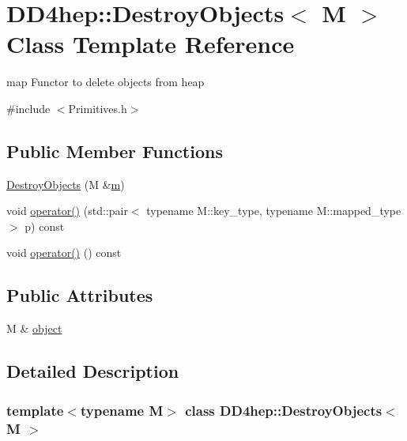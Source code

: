 \hypertarget{class_d_d4hep_1_1_destroy_objects}{}\section{D\+D4hep\+:\+:Destroy\+Objects$<$ M $>$ Class Template Reference}
\label{class_d_d4hep_1_1_destroy_objects}


map Functor to delete objects from heap  




{\ttfamily \#include $<$Primitives.\+h$>$}

\subsection*{Public Member Functions}
\begin{DoxyCompactItemize}
\item 
\hyperlink{class_d_d4hep_1_1_destroy_objects_afa755ee063407e0d37a4906a3a17f855}{Destroy\+Objects} (M \&\hyperlink{_volumes_8cpp_a6fc379aaec47ce424b00d8ffda2a6c59}{m})
\item 
void \hyperlink{class_d_d4hep_1_1_destroy_objects_ac5430a41ccfe1e8a063cf12175f169ab}{operator()} (std\+::pair$<$ typename M\+::key\+\_\+type, typename M\+::mapped\+\_\+type $>$ p) const
\item 
void \hyperlink{class_d_d4hep_1_1_destroy_objects_ab7b9cf128c08ef8487521286fad76cc0}{operator()} () const
\end{DoxyCompactItemize}
\subsection*{Public Attributes}
\begin{DoxyCompactItemize}
\item 
M \& \hyperlink{class_d_d4hep_1_1_destroy_objects_a6561f28791b7de118aefc686be64c55d}{object}
\end{DoxyCompactItemize}


\subsection{Detailed Description}
\subsubsection*{template$<$typename M$>$\newline
class D\+D4hep\+::\+Destroy\+Objects$<$ M $>$}

